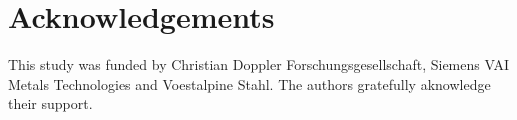 \section{Acknowledgements}
This study was funded by Christian Doppler Forschungsgesellschaft, Siemens VAI Metals Technologies and Voestalpine Stahl. The authors gratefully aknowledge their support.
